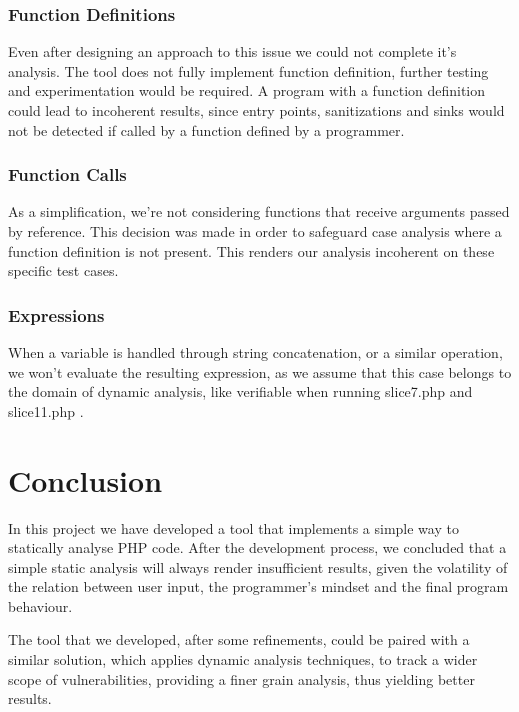 \documentclass[10pt,onecolumn,a4paper]{article}
\begin{document}
\subsubsection{Function Definitions}
\hspace{3.5mm} Even after designing an approach to this issue we could not complete it's analysis. The tool does not fully implement function definition, further testing and experimentation would be required. A program with a function definition could lead to incoherent results, since entry points, sanitizations and sinks would not be detected if called by a function defined by a programmer.

\subsubsection{Function Calls}
\hspace{3.5mm} As a simplification, we're not considering functions that receive arguments passed by reference. This decision was made in order to safeguard case analysis where a function definition is not present. This renders our analysis incoherent on these specific test cases.

\subsubsection{Expressions}
\hspace{3.5mm} When a variable is handled through string concatenation, or a similar operation, we won't evaluate the resulting expression, as we assume that this case belongs to the domain of dynamic analysis, like verifiable when running slice7.php and slice11.php \cite{SLICES}.  




%
%
\section{Conclusion}
\hspace{3.5mm}	In this project we have developed a tool that implements a simple way to statically analyse PHP code. After the development process, we concluded that a simple static analysis will always render insufficient results, given the volatility of the relation between user input, the programmer's mindset and the final program behaviour.

The tool that we developed, after some refinements, could be paired with a similar solution, which applies dynamic analysis techniques, to track a wider scope of vulnerabilities, providing a finer grain analysis, thus yielding better results.     
	
\end{document}
